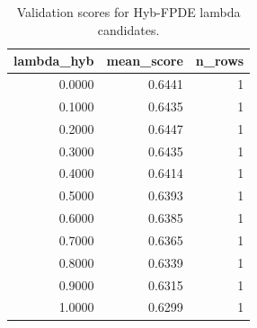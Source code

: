 \begin{table}[t]
\caption{Validation scores for Hyb-FPDE lambda candidates.}
\label{tab:lambda_distribution_computed}
\centering
\begin{tabular}{rrr}
\toprule
lambda\_hyb & mean\_score & n\_rows \\
\midrule
0.0000 & 0.6441 & 1 \\
0.1000 & 0.6435 & 1 \\
0.2000 & 0.6447 & 1 \\
0.3000 & 0.6435 & 1 \\
0.4000 & 0.6414 & 1 \\
0.5000 & 0.6393 & 1 \\
0.6000 & 0.6385 & 1 \\
0.7000 & 0.6365 & 1 \\
0.8000 & 0.6339 & 1 \\
0.9000 & 0.6315 & 1 \\
1.0000 & 0.6299 & 1 \\
\bottomrule
\end{tabular}

\end{table}
